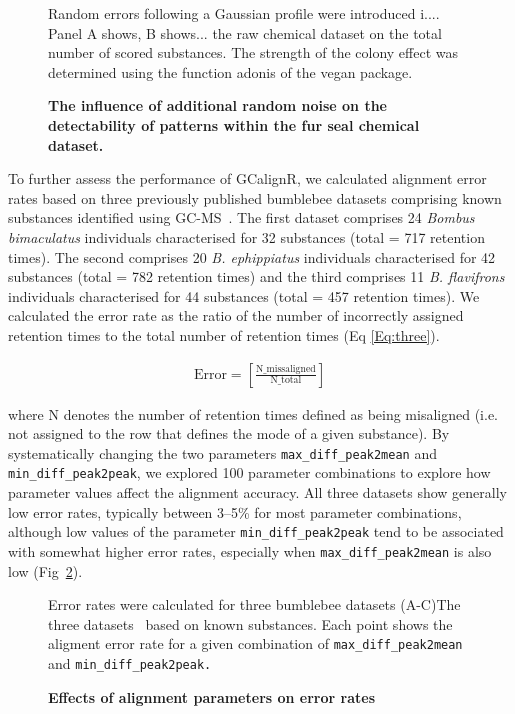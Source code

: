 \documentclass[10pt,letterpaper]{article}
\begin{document}
\begin{figure}[htbp]
\centering
\caption{\textbf{The influence of additional random noise on the detectability of patterns within the fur seal chemical dataset.}}
Random errors following a Gaussian profile were introduced i.... Panel A shows, B shows... the raw chemical dataset on the total number of scored substances. The strength of the colony effect was determined using the function adonis of the vegan package.
\label{Fig:Fig6}
\end{figure} 

To further assess the performance of GCalignR, we calculated alignment error rates based on three previously published bumblebee datasets comprising known substances identified using GC-MS~\cite{Dellicour.2013}. The first dataset comprises 24 \textit{Bombus bimaculatus} individuals characterised for 32 substances (total = 717 retention times).  The second comprises 20 \textit{B. ephippiatus} individuals characterised for 42 substances (total = 782 retention times) and the third comprises 11 \textit{B. flavifrons} individuals characterised for 44 substances (total = 457 retention times). We calculated the error rate as the ratio of the number of incorrectly assigned retention times to the total number of retention times (Eq \eqref{Eq:three}).

\begin{eqnarray}
\label{Eq:three}
\mathrm{Error} = \left[\frac{\mathrm{N\_missaligned}}{\mathrm{N\_total}}\right] 
\end{eqnarray}

where N denotes the number of retention times defined as being misaligned (i.e. not assigned to the row that defines the mode of a given substance). By systematically changing the two parameters \texttt{max\_diff\_peak2mean} and \texttt{min\_diff\_peak2peak}, we explored 100 parameter combinations to explore how parameter values affect the alignment accuracy. All three datasets show generally low error rates, typically between 3–5\% for most parameter combinations, although low values of the parameter \texttt{min\_diff\_peak2peak} tend to be associated with somewhat higher error rates, especially when \texttt{max\_diff\_peak2mean} is also low (Fig~\ref{Fig:Fig7}).

\begin{figure}[htbp]
\centering
\caption{\textbf{Effects of alignment parameters on error rates}}
Error rates were calculated for three bumblebee datasets (A-C)The three datasets~\cite{Dellicour.2013} based on known substances. Each point shows the aligment error rate for a given combination of \texttt{max\_diff\_peak2mean} and \texttt{min\_diff\_peak2peak.}
\label{Fig:Fig7}
\end{figure} 
\end{document}
